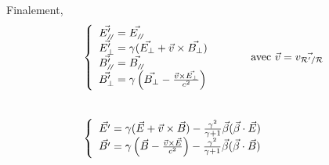 Finalement,
$$
\begin{array}{l}
	\left\{ \begin{array}{r@{\;}l}
		\vec{E'_{\para}}&=\vec{E_{\para}}\\
		\vec{E'_{\perp}}&=\gamma (\vec{E_{\perp}}+\vec{v}\times\vec{B_{\perp}})\\
		\vec{B'_{\para}}&=\vec{B_{\para}}\\
		\vec{B'_{\perp}}&=\gamma \left(\vec{B_{\perp}}-\frac{\vec{v}\times\vec{E_{\perp}}}{c^2}\right)
	\end{array} \right.
	\text{\hspace{1cm} avec }\vec{v}=\vec{v_{\mathcal{R'}/\mathcal{R}}}\\[50pt]	
	\left\{ \begin{array}{r@{\;}l}
		\vec{E'}&=\gamma (\vec{E}+\vec{v}\times\vec{B})-\frac{\gamma^2}{\gamma +1}\vec{\beta}(\vec{\beta}\cdot\vec{E})\\
		\vec{B'}&=\gamma\left(\vec{B}-\frac{\vec{v}\times\vec{E}}{c^2}\right)-\frac{\gamma^2}{\gamma +1}\vec{\beta}(\vec{\beta}\cdot\vec{B})
	\end{array} \right.
\end{array}
$$

